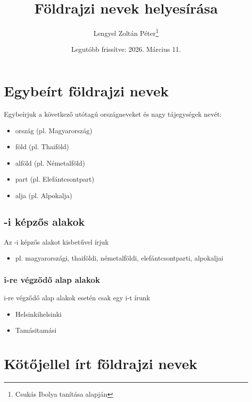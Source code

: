 \documentclass{article}
\title{Földrajzi nevek helyesírása}
\author{Lengyel Zoltán Péter\thanks{Csukás Ibolya tanítása alapján}}
\date{Legutóbb frissítve: 2026. Március 11.}
\begin{document}
\maketitle
\tableofcontents
\newpage

\section{Egybeírt földrajzi nevek}
Egybeírjuk a következő utótagú országneveket és nagy tájegységek nevét:
\begin{itemize}
    \item ország (pl. Magyarország)
    \item föld (pl. Thaiföld)
    \item alföld (pl. Németalföld)
    \item part (pl. Elefántcsontpart)
    \item alja (pl. Alpokalja)
\end{itemize} 

\subsection{-i képzős alakok}
Az -i képzős alakot kisbetűvel írjuk
\begin{itemize}
    \item pl. magyarországi, thaiföldi, németalföldi, elefántcsontparti, alpokaljai
\end{itemize}

\subsubsection{i-re végződő alap alakok}
i-re végződő alap alakok esetén csak egy i-t írunk
\begin{itemize}
    \item Helsinki\textrightarrow helsinki
    \item Tamási\textrightarrow tamási
\end{itemize}

\section{Kötőjellel írt földrajzi nevek}
\end{document}
